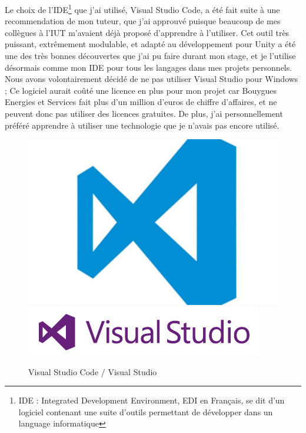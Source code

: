 \documentclass[a4paper]{article}
\begin{document}
    Le choix de l'IDE\footnote{IDE : Integrated Development Environment, EDI en Français, se dit d'un logiciel contenant une suite d'outils permettant de développer dans un language informatique} que j'ai utilisé, Visual Studio Code, a été fait suite à une recommendation de mon tuteur, que j'ai approuvé puisque beaucoup de mes collègues à l'IUT m'avaient déjà proposé d'apprendre à l'utiliser. Cet outil très puissant, extrêmement modulable, et adapté au développement pour Unity a été une des très bonnes découvertes que j'ai pu faire durant mon stage, et je l'utilise désormais comme mon IDE pour tous les langages dans mes projets personnels. Nous avons volontairement décidé de ne pas utiliser Visual Studio pour Windows ; Ce logiciel aurait coûté une licence en plus pour mon projet car Bouygues Energies et Services fait plus d'un million d'euros de chiffre d'affaires, et ne peuvent donc pas utiliser des licences gratuites. De plus, j'ai personnellement préféré apprendre à utiliser une technologie que je n'avais pas encore utilisé. \\

    \begin{figure}[H]
        \centering
        \includegraphics[scale=0.05]{img/Logo-VSCode}
        \hspace{10pt}
        \includegraphics[scale=0.5]{img/logo-visual-studio}
        \caption{Visual Studio Code / Visual Studio}
    \end{figure}
\end{document}
